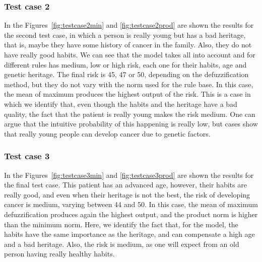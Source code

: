 \documentclass[conference]{IEEEtran}
\begin{document}
\subsubsection{Test case 2}
In the Figures~\ref{fig:testcase2min} and \ref{fig:testcase2prod} are shown the results for the second test case, in which a person is really young but has a bad heritage, that is, maybe they have some history of cancer in the family. Also, they do not have really good habits. We can see that the model takes all into account and for different rules has medium, low or high risk, each one for their habits, age and genetic heritage. The final risk is 45, 47 or 50, depending on the defuzzification method, but they do not vary with the norm used for the rule base. In this case, the mean of maximum produces the highest output of the risk. This is a case in which we identify that, even though the habits and the heritage have a bad quality, the fact that the patient is really young makes the risk medium. One can argue that the intuitive probability of this happening is really low, but cases show that really young people can develop cancer due to genetic factors.


\subsubsection{Test case 3}
In the Figures~\ref{fig:testcase3min} and \ref{fig:testcase3prod} are shown the results for the final test case. This patient has an advanced age, however, their habits are really good, and even when their heritage is not the best, the risk of developing cancer is medium, varying between 44 and 50. In this case, the mean of maximum defuzzification produces again the highest output, and the product norm is higher than the minimum norm. Here, we identify the fact that, for the model, the habits have the same importance as the heritage, and can compensate a high age and a bad heritage. Also, the risk is medium, as one will expect from an old person having really healthy habits.

\end{document}
